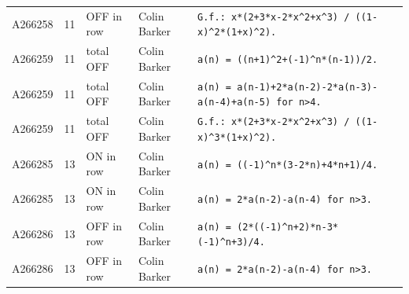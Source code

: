 \documentclass[11pt]{article}
\theoremstyle{definition}
\theoremstyle{remark}
\begin{document}
{\begin{longtable}{p{1.3cm}p{0.7cm}p{2.4cm}p{2.3cm}p{7.3cm}}
A266258 & 11 & OFF in row & Colin Barker & \texttt{G.f.: \allowbreak{}x*\allowbreak{}(2+\allowbreak{}3*\allowbreak{}x-\allowbreak{}2*\allowbreak{}x\^{}2+\allowbreak{}x\^{}3)\allowbreak{} \allowbreak{}/\allowbreak{} \allowbreak{}((1-\allowbreak{}x)\allowbreak{}\^{}2*\allowbreak{}(1+\allowbreak{}x)\allowbreak{}\^{}2)\allowbreak{}.} \\
A266259 & 11 & total OFF & Colin Barker & \texttt{a(n)\allowbreak{} \allowbreak{}=\allowbreak{} \allowbreak{}((n+\allowbreak{}1)\allowbreak{}\^{}2+\allowbreak{}(-\allowbreak{}1)\allowbreak{}\^{}n*\allowbreak{}(n-\allowbreak{}1)\allowbreak{})\allowbreak{}/\allowbreak{}2.} \\
A266259 & 11 & total OFF & Colin Barker & \texttt{a(n)\allowbreak{} \allowbreak{}=\allowbreak{} \allowbreak{}a(n-\allowbreak{}1)\allowbreak{}+\allowbreak{}2*\allowbreak{}a(n-\allowbreak{}2)\allowbreak{}-\allowbreak{}2*\allowbreak{}a(n-\allowbreak{}3)\allowbreak{}-\allowbreak{}a(n-\allowbreak{}4)\allowbreak{}+\allowbreak{}a(n-\allowbreak{}5)\allowbreak{} \allowbreak{}for \allowbreak{}n>4.} \\
A266259 & 11 & total OFF & Colin Barker & \texttt{G.f.: \allowbreak{}x*\allowbreak{}(2+\allowbreak{}3*\allowbreak{}x-\allowbreak{}2*\allowbreak{}x\^{}2+\allowbreak{}x\^{}3)\allowbreak{} \allowbreak{}/\allowbreak{} \allowbreak{}((1-\allowbreak{}x)\allowbreak{}\^{}3*\allowbreak{}(1+\allowbreak{}x)\allowbreak{}\^{}2)\allowbreak{}.} \\
A266285 & 13 & ON in row & Colin Barker & \texttt{a(n)\allowbreak{} \allowbreak{}=\allowbreak{} \allowbreak{}((-\allowbreak{}1)\allowbreak{}\^{}n*\allowbreak{}(3-\allowbreak{}2*\allowbreak{}n)\allowbreak{}+\allowbreak{}4*\allowbreak{}n+\allowbreak{}1)\allowbreak{}/\allowbreak{}4.} \\
A266285 & 13 & ON in row & Colin Barker & \texttt{a(n)\allowbreak{} \allowbreak{}=\allowbreak{} \allowbreak{}2*\allowbreak{}a(n-\allowbreak{}2)\allowbreak{}-\allowbreak{}a(n-\allowbreak{}4)\allowbreak{} \allowbreak{}for \allowbreak{}n>3.} \\
A266286 & 13 & OFF in row & Colin Barker & \texttt{a(n)\allowbreak{} \allowbreak{}=\allowbreak{} \allowbreak{}(2*\allowbreak{}((-\allowbreak{}1)\allowbreak{}\^{}n+\allowbreak{}2)\allowbreak{}*\allowbreak{}n-\allowbreak{}3*\allowbreak{}(-\allowbreak{}1)\allowbreak{}\^{}n+\allowbreak{}3)\allowbreak{}/\allowbreak{}4.} \\
A266286 & 13 & OFF in row & Colin Barker & \texttt{a(n)\allowbreak{} \allowbreak{}=\allowbreak{} \allowbreak{}2*\allowbreak{}a(n-\allowbreak{}2)\allowbreak{}-\allowbreak{}a(n-\allowbreak{}4)\allowbreak{} \allowbreak{}for \allowbreak{}n>3.} \\

\end{longtable}}
\end{document}
